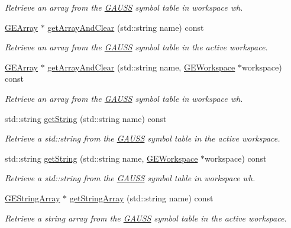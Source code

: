\begin{DoxyCompactItemize}
\begin{DoxyCompactList}\small\item\em Retrieve an array from the \hyperlink{class_g_a_u_s_s}{G\-A\-U\-S\-S} symbol table in workspace {\itshape wh}. \end{DoxyCompactList}\item 
\hyperlink{class_g_e_array}{G\-E\-Array} $\ast$ \hyperlink{class_g_a_u_s_s_a17a3875e218aa91efd0a7db598e75654}{get\-Array\-And\-Clear} (std\-::string name) const 
\begin{DoxyCompactList}\small\item\em Retrieve an array from the \hyperlink{class_g_a_u_s_s}{G\-A\-U\-S\-S} symbol table in the active workspace. \end{DoxyCompactList}\item 
\hyperlink{class_g_e_array}{G\-E\-Array} $\ast$ \hyperlink{class_g_a_u_s_s_a26dd5b391e0171865444a8b895173a4c}{get\-Array\-And\-Clear} (std\-::string name, \hyperlink{class_g_e_workspace}{G\-E\-Workspace} $\ast$workspace) const 
\begin{DoxyCompactList}\small\item\em Retrieve an array from the \hyperlink{class_g_a_u_s_s}{G\-A\-U\-S\-S} symbol table in workspace {\itshape wh}. \end{DoxyCompactList}\item 
std\-::string \hyperlink{class_g_a_u_s_s_a9450de4e3121f4ae558fe8afe0d97a32}{get\-String} (std\-::string name) const 
\begin{DoxyCompactList}\small\item\em Retrieve a std\-::string from the \hyperlink{class_g_a_u_s_s}{G\-A\-U\-S\-S} symbol table in the active workspace. \end{DoxyCompactList}\item 
std\-::string \hyperlink{class_g_a_u_s_s_a418eb8946035ddbe9ff13ff66d1ddfc8}{get\-String} (std\-::string name, \hyperlink{class_g_e_workspace}{G\-E\-Workspace} $\ast$workspace) const 
\begin{DoxyCompactList}\small\item\em Retrieve a std\-::string from the \hyperlink{class_g_a_u_s_s}{G\-A\-U\-S\-S} symbol table in workspace {\itshape wh}. \end{DoxyCompactList}\item 
\hyperlink{class_g_e_string_array}{G\-E\-String\-Array} $\ast$ \hyperlink{class_g_a_u_s_s_aa837668c5474647b6c65b6c207d629ee}{get\-String\-Array} (std\-::string name) const 
\begin{DoxyCompactList}\small\item\em Retrieve a string array from the \hyperlink{class_g_a_u_s_s}{G\-A\-U\-S\-S} symbol table in the active workspace. \end{DoxyCompactList}\item 

\end{DoxyCompactItemize}
